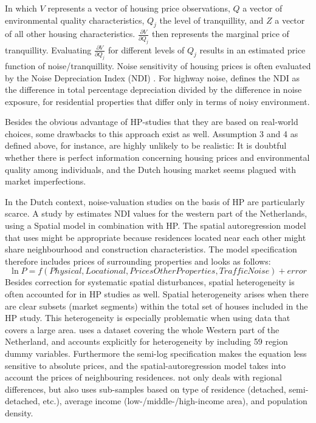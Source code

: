 \documentclass[a4paper]{scrartcl}
\begin{document}
In which $V$ represents a vector of housing price observations, $Q$ a vector of environmental quality characteristics, $Q_j$ the level of tranquillity, and $Z$ a vector of all other housing characteristics. $\frac{\partial V}{\partial Q_j }$ then represents the marginal price of tranquillity. Evaluating  $\frac{\partial V}{\partial Q_j }$ for different levels of $Q_j$ results in an estimated price function of noise/tranquillity. Noise sensitivity of housing prices is often evaluated by the Noise Depreciation Index (NDI) \citep{Walters1975}. For highway noise, \cite{Nelson1982} defines the NDI as the difference in total percentage depreciation divided by the difference in noise exposure, for residential properties that differ only in terms of noisy environment.	

Besides the obvious advantage of HP-studies that they are based on real-world choices, some drawbacks to this approach exist as well. Assumption 3 and 4 as defined above, for instance, are highly unlikely to be realistic: It is doubtful whether there is perfect information concerning housing prices and environmental quality among individuals, and the Dutch housing market seems plagued with market imperfections.

In the Dutch context, noise-valuation studies on the basis of HP are particularly scarce. A study by \cite{Theebe2004} estimates NDI values for the western part of the Netherlands, using a Spatial model in combination with HP. The spatial autoregression model that \cite{Theebe2004} uses might be appropriate because residences located near each other might share neighbourhood and construction characteristics. The model specification therefore includes prices of surrounding properties and looks as follows: 
\begin{equation}
\ln{P} = f(Physical, Locational, Prices Other Properties, Traffic Noise) + error 
\end{equation}
Besides correction for systematic spatial disturbances, spatial heterogeneity is often accounted for in HP studies as well. Spatial heterogeneity arises when there are clear subsets (market segments) within the total set of houses included in the HP study. This heterogeneity is especially problematic when using data that covers a large area. \cite{Theebe2004} uses a dataset covering the whole Western part of the Netherland, and accounts explicitly for heterogeneity by including 59 region dummy variables. Furthermore the semi-log specification makes the equation less sensitive to absolute prices, and the spatial-autoregression model takes into account the prices of neighbouring residences. \cite{Theebe2004} not only deals with regional differences, but also uses sub-samples based on type of residence (detached, semi-detached, etc.), average income (low-/middle-/high-income area), and population density.
\end{document}
